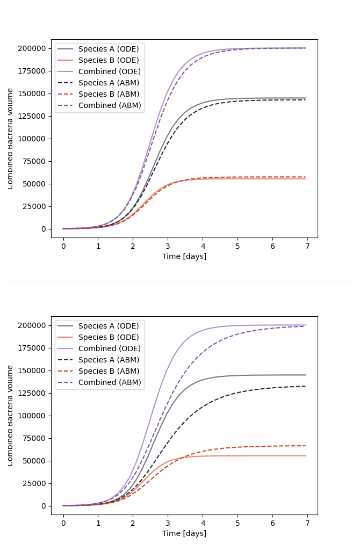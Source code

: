 \documentclass[10pt,A4paper]{article}
\numberwithin{equation}{section}
\begin{document}
\begin{figure}
    \centering
    \begin{subfigure}[c]{0.5\columnwidth}
        \includegraphics[width=\columnwidth]{Figures/abm-homogenous/abm_ode_comparison.png}
    \end{subfigure}%
    \begin{subfigure}[c]{0.5\columnwidth}
        \includegraphics[width=\columnwidth]{Figures/abm-homogenous-low-diffusion/abm_ode_comparison.png}
    \end{subfigure}\\

\end{figure}
\end{document}
